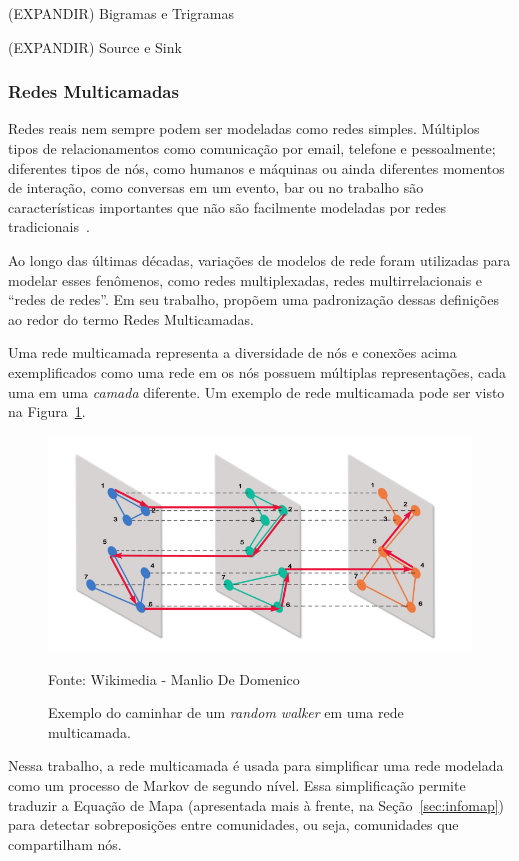 \documentclass[12pt,a4paper]{article}
\newcommand{\source}[1]{\vspace{-10pt} \caption*{Fonte: {#1}} }
\begin{document}
(EXPANDIR) Bigramas e Trigramas

(EXPANDIR) Source e Sink

\subsubsection{Redes Multicamadas} \label{sec:multicamadas}

Redes reais nem sempre podem ser modeladas como redes simples. Múltiplos tipos de relacionamentos como comunicação por email, telefone e pessoalmente; diferentes tipos de nós, como humanos e máquinas ou ainda diferentes momentos de interação, como conversas em um evento, bar ou no trabalho são características importantes que não são facilmente modeladas por redes tradicionais~\cite{Kivela2014-pb}.

Ao longo das últimas décadas, variações de modelos de rede foram utilizadas para modelar esses fenômenos, como redes multiplexadas, redes multirrelacionais e \enquote{redes de redes}. Em seu trabalho,  propõem uma padronização dessas definições ao redor do termo Redes Multicamadas.

Uma rede multicamada representa a diversidade de nós e conexões acima exemplificados como uma rede em os nós possuem múltiplas representações, cada uma em uma \textit{camada} diferente. Um exemplo de rede multicamada pode ser visto na Figura~\ref{fig:ex-multicamada}.

\begin{figure}[ht]
    \centering
    \includegraphics[scale=0.4]{random_walks_on_multilayer_networks}
    \caption{Exemplo do caminhar de um \textit{random walker} em uma rede multicamada.}
    \source{Wikimedia - Manlio De Domenico}
    \label{fig:ex-multicamada}
\end{figure}

Nessa trabalho, a rede multicamada é usada para simplificar uma rede modelada como um processo de Markov de segundo nível. Essa simplificação permite traduzir a Equação de Mapa (apresentada mais à frente, na Seção~\ref{sec:infomap}) para detectar sobreposições entre comunidades, ou seja, comunidades que compartilham nós.
\end{document}
